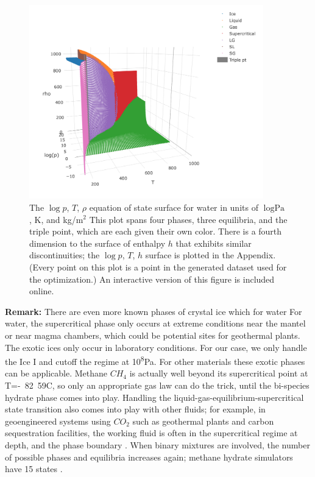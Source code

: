 \documentclass[]{article}
\begin{document}
\begin{figure}
\centering
\includegraphics[width=4in]{../figures/water_eos.png}
\caption{\label{fig:pTrho} The $\log{p}$, $T$, $\rho$ equation of
  state surface for water in units of $\log{\text{Pa}}$, K, and \si{}{kg/m$^2$} This plot spans four phases, three
  equilibria, and the triple point, which are each given their own color.
  There is a fourth dimension to the surface of enthalpy $h$ that exhibits
  similar discontinuities; the $\log{p}$, $T$, $h$ surface is plotted
  in the Appendix. (Every point on this plot is a point in the
  generated dataset used for the optimization.) An interactive version
of this figure is included online.}
\end{figure}


{\bf Remark:} There are even more known phases of crystal ice which for water
For water, the supercritical phase only occurs at extreme conditions
near the mantel or near magma chambers, which could be potential sites
for geothermal plants\cite{elders_science_2010}. The exotic ices only occur in
laboratory conditions\cite{water_revised_2009}. For our case, we only handle the Ice I and cutoff the
regime at \si{10^8}{Pa}. For other materials these exotic phases can be
applicable. Methane $CH_4$ is actually well beyond its supercritical
point at T=\si{-82.59}{C}\cite{the_engineering_toolbox_methane_2008}, so only an appropriate gas law can do the trick, until
the bi-species hydrate phase comes into play. Handling the
liquid-gas-equilibrium-supercritical state transition also comes into
play with other fluids; for example, in geoengineered systems using
$CO_2$ such as geothermal plants and carbon sequestration facilities, the
working fluid is often in the supercritical regime at depth, and the
phase boundary \cite{pruess_feasibility_2006,oldenburg_migration_2006}. 
When binary mixtures are involved, the number of possible phases and
equilibria increases again; methane hydrate simulators have 15
states \cite{moridis_simulation_2019}.
\end{document}
